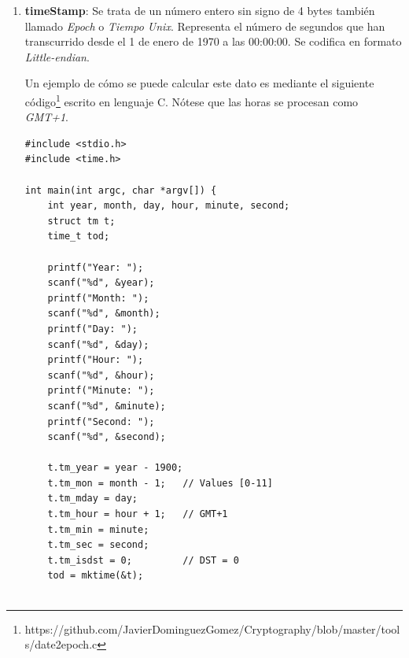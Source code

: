 \documentclass{article}
\begin{document}
\begin{enumerate}
\begin{verbatim}
    for (string node; buf >> node;)
        leafNodesV.push_back(sha256(node));
        
    printVector(leafNodesV);
    cout << "Root: " << merkleTree(leafNodesV) << endl;
    
    return 0;
}

string merkleTree(vector<string> v) {
    if (v.size() > 1) {
        vector<string> aux;
        int i;
        
        for (i = 0; i < v.size(); i += 2) {
            if (i == v.size() - 1) {
                aux.push_back(v[i]);
            } else if (i < v.size()) {
                aux.push_back(sha256(v[i] + v[i + 1]));
            }
        }
        merkleTree(aux);
    } else if(v.size() == 1){
        merkleTreeRoot = v[0];
    }
    
    return merkleTreeRoot;
}

void printVector(vector<string> v) {
    cout << "v.size() = " << v.size() << endl;
    int i = 0;
    while (i < v.size()) {
        cout << "v[" << i << "]: " << v[i] << endl;
        i++;
    }
}
        \end{verbatim}
        
        \item \textbf{timeStamp}: Se trata de un número entero sin signo de 4 bytes también llamado \textit{Epoch} o \textit{Tiempo Unix}. Representa el número de segundos que han transcurrido desde el 1 de enero de 1970 a las 00:00:00. Se codifica en formato \textit{Little-endian}.
        
        Un ejemplo de cómo se puede calcular este dato es mediante el siguiente código\footnote{https://github.com/JavierDominguezGomez/Cryptography/blob/master/tools/date2epoch.c} escrito en lenguaje C. Nótese que las horas se procesan como \textit{GMT+1}.
        
        \begin{verbatim}
#include <stdio.h>
#include <time.h>

int main(int argc, char *argv[]) {
    int year, month, day, hour, minute, second;
    struct tm t;
    time_t tod;
    
    printf("Year: ");
    scanf("%d", &year);
    printf("Month: ");
    scanf("%d", &month);
    printf("Day: ");
    scanf("%d", &day);
    printf("Hour: ");
    scanf("%d", &hour);
    printf("Minute: ");
    scanf("%d", &minute);
    printf("Second: ");
    scanf("%d", &second);
    
    t.tm_year = year - 1900;
    t.tm_mon = month - 1;   // Values [0-11]
    t.tm_mday = day;
    t.tm_hour = hour + 1;   // GMT+1
    t.tm_min = minute;
    t.tm_sec = second;
    t.tm_isdst = 0;         // DST = 0
    tod = mktime(&t);
    

\end{verbatim}
\end{enumerate}
\end{document}
